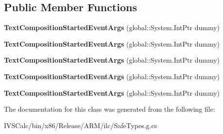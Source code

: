 \subsection*{Public Member Functions}
\begin{DoxyCompactItemize}
\item 
\mbox{\label{class_windows_1_1_u_i_1_1_xaml_1_1_controls_1_1_text_composition_started_event_args_af38b4989bdd32626718b3d90e2f4378e}} 
{\bfseries Text\+Composition\+Started\+Event\+Args} (global\+::\+System.\+Int\+Ptr dummy)
\item 
\mbox{\label{class_windows_1_1_u_i_1_1_xaml_1_1_controls_1_1_text_composition_started_event_args_af38b4989bdd32626718b3d90e2f4378e}} 
{\bfseries Text\+Composition\+Started\+Event\+Args} (global\+::\+System.\+Int\+Ptr dummy)
\item 
\mbox{\label{class_windows_1_1_u_i_1_1_xaml_1_1_controls_1_1_text_composition_started_event_args_af38b4989bdd32626718b3d90e2f4378e}} 
{\bfseries Text\+Composition\+Started\+Event\+Args} (global\+::\+System.\+Int\+Ptr dummy)
\item 
\mbox{\label{class_windows_1_1_u_i_1_1_xaml_1_1_controls_1_1_text_composition_started_event_args_af38b4989bdd32626718b3d90e2f4378e}} 
{\bfseries Text\+Composition\+Started\+Event\+Args} (global\+::\+System.\+Int\+Ptr dummy)
\item 
\mbox{\label{class_windows_1_1_u_i_1_1_xaml_1_1_controls_1_1_text_composition_started_event_args_af38b4989bdd32626718b3d90e2f4378e}} 
{\bfseries Text\+Composition\+Started\+Event\+Args} (global\+::\+System.\+Int\+Ptr dummy)
\end{DoxyCompactItemize}


The documentation for this class was generated from the following file\+:\begin{DoxyCompactItemize}
\item 
I\+V\+S\+Calc/bin/x86/\+Release/\+A\+R\+M/ilc/Safe\+Types.\+g.\+cs\end{DoxyCompactItemize}
